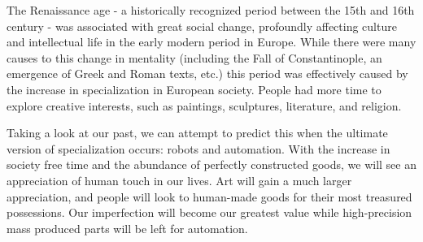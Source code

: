 The Renaissance age - a historically recognized period between the 15th and 16th century - was associated with great social change, profoundly affecting culture and intellectual life in the early modern period in Europe. While there were many causes to this change in mentality (including the Fall of Constantinople, an emergence of Greek and Roman texts, etc.) this period was effectively caused by the increase in specialization in European society. People had more time to explore creative interests, such as paintings, sculptures, literature, and religion.

Taking a look at our past, we can attempt to predict this when the ultimate version of specialization occurs: robots and automation. With the increase in society free time and the abundance of perfectly constructed goods, we will see an appreciation of human touch in our lives. Art will gain a much larger appreciation, and people will look to human-made goods for their most treasured possessions. Our imperfection will become our greatest value while high-precision mass produced parts will be left for automation.